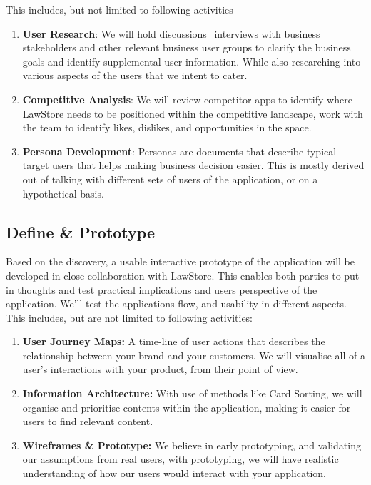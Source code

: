 \documentclass[a4paper,10pt]{article}
\begin{document}
		This includes, but not limited to following activities
		
		\begin{enumerate}
			\def\labelenumi{\arabic{enumi}.}
			\item
			\textbf{User Research}: We will hold discussions\_interviews
			with business stakeholders and other relevant business user groups to
			clarify the business goals and identify supplemental user information. While also researching into various aspects of the users that we intent to cater.
			\item
			\textbf{Competitive Analysis}: We will review competitor apps to
			identify where LawStore needs to be positioned within the competitive
			landscape, work with the team to identify likes, dislikes, and opportunities in the space.
			\item
			\textbf{Persona Development}: Personas are documents that describe
			typical target users that helps making business decision easier. This is mostly derived out of talking with different sets of users of the application, or on a hypothetical basis.
		\end{enumerate}
	
		\subsection{Define \& Prototype}
		Based on the discovery, a usable interactive prototype of the
		application will be developed in close collaboration with LawStore. This
		enables both parties to put in thoughts and test practical implications
		and users perspective of the application. We'll test the applications
		flow, and usability in different aspects. This includes, but are not
		limited to following activities:
		
		\begin{enumerate}
		\def\labelenumi{\arabic{enumi}.}
		\item
		\textbf{User Journey Maps:} A time-line of user actions that describes
		the relationship between your brand and your customers. We will
		visualise all of a user's interactions with your product, from their
		point of view.
		\item
		\textbf{Information Architecture:} With use of methods like Card
		Sorting, we will organise and prioritise contents within the
		application, making it easier for users to find relevant content.
		\item
		\textbf{Wireframes \& Prototype:} We believe in early prototyping, and validating
		our assumptions from real users, with prototyping, we will have
		realistic understanding of how our users would interact with your
		application.
		\end{enumerate}
		
\end{document}
